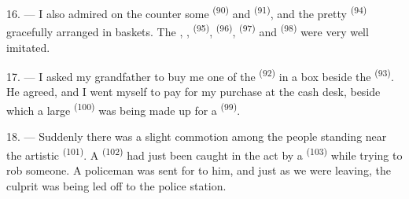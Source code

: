 16. --- I also admired on the counter some  \textsuperscript{(90)} and
 \textsuperscript{(91)}, and the pretty
 \textsuperscript{(94)} gracefully arranged in baskets. The
, ,  \textsuperscript{(95)},
 \textsuperscript{(96)},  \textsuperscript{(97)} and
 \textsuperscript{(98)} were very well imitated.

\VUsaut{4.4mm}
\VUsaut{2.8mm}

17. --- I asked my grandfather to buy me one of the 
\textsuperscript{(92)} in a box beside the  \textsuperscript{(93)}. He
agreed, and I went myself to pay for my purchase at the cash desk, beside which a large
 \textsuperscript{(100)} was being made up for a 
\textsuperscript{(99)}.

18. --- Suddenly there was a slight commotion among the people standing near the artistic
 \textsuperscript{(101)}. A  \textsuperscript{(102)} had just
been caught in the act by a  \textsuperscript{(103)} while trying to
rob someone. A policeman was sent for to
 him, and just as we were leaving, the culprit was being led
off to the police station.
\VUsaut{6.0mm}
\VUfilet{22mm}
